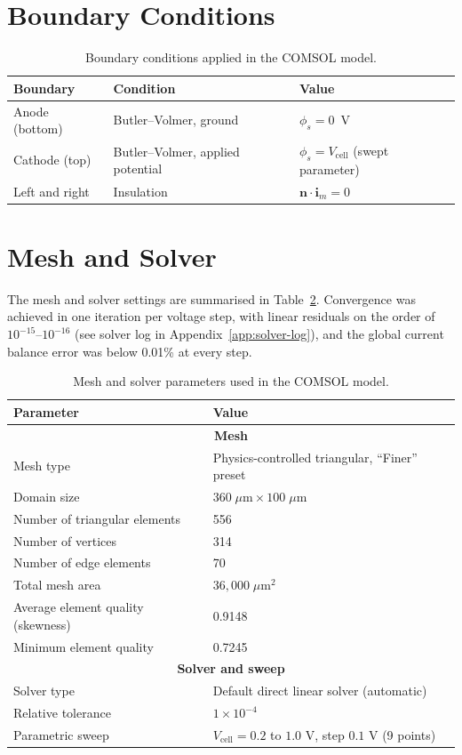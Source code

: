 \documentclass[12pt,a4paper]{report}
\begin{document}
\section{Boundary Conditions}

\begin{table}[h]
\centering
\caption{Boundary conditions applied in the COMSOL model.}
\label{tab:comsol-bc}
\begin{tabular}{lll}
\toprule
Boundary & Condition & Value \\
\midrule
Anode (bottom) & Butler--Volmer, ground & $\phi_s = 0$~V \\
Cathode (top) & Butler--Volmer, applied potential & 
$\phi_s = V_{\text{cell}}$ (swept parameter) \\
Left and right & Insulation & $\mathbf{n} \cdot 
\mathbf{i}_m = 0$ \\
\bottomrule
\end{tabular}
\end{table}

\section{Mesh and Solver}

The mesh and solver settings are summarised in Table~\ref{tab:mesh-solver}. 
Convergence was achieved in one iteration per voltage step, with linear residuals 
on the order of $10^{-15}$--$10^{-16}$ (see solver log in 
Appendix~\ref{app:solver-log}), and the global current balance error was below 
0.01\% at every step.

\begin{table}[h]
\centering
\caption{Mesh and solver parameters used in the COMSOL model.}
\label{tab:mesh-solver}
\begin{tabular}{ll}
\toprule
Parameter & Value \\
\midrule
\multicolumn{2}{c}{\hspace*{-2cm}\textbf{Mesh}} \\
Mesh type & Physics-controlled triangular, ``Finer'' preset \\
Domain size & $360\;\mu\text{m} \times 100\;\mu\text{m}$ \\
Number of triangular elements & 556 \\
Number of vertices & 314 \\
Number of edge elements & 70 \\
Total mesh area & $36{,}000\;\mu\text{m}^2$ \\
Average element quality (skewness) & 0.9148 \\
Minimum element quality & 0.7245 \\
\midrule
\multicolumn{2}{c}{\textbf{Solver and sweep}} \\
Solver type & Default direct linear solver (automatic) \\
Relative tolerance & $1 \times 10^{-4}$ \\
Parametric sweep & $V_{\text{cell}} = 0.2$ to $1.0$ V, step $0.1$ V (9 points) \\
\bottomrule
\end{tabular}
\end{table}
\end{document}
